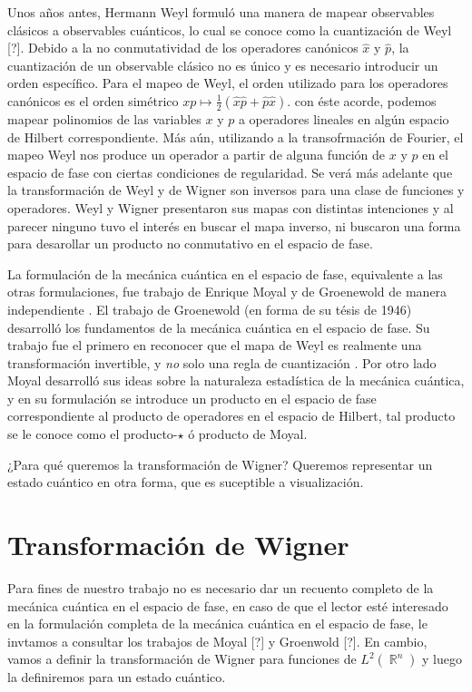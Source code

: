 \documentclass[a4paper]{report}
\DeclareMathOperator{\R}{\mathbb{R}}
\begin{document}
  Unos años antes, Hermann Weyl formuló una manera de mapear
  observables clásicos a observables cuánticos, lo cual se
  conoce como la cuantización de Weyl [?]. Debido a la no
  conmutatividad de los operadores canónicos $\hat{x}$ y
  $\hat{p}$, la cuantización de un observable clásico no es
  único y es necesario introducir un orden específico. Para
  el mapeo de Weyl, el orden utilizado para los operadores
  canónicos es el orden simétrico     $xp \mapsto
  \frac{1}{2}\left( \hat{x} \hat{p} + \hat{p} \hat{x}
  \right)$.  con éste acorde, podemos mapear polinomios de
  las variables $x$ y $p$ a operadores lineales en algún
  espacio de Hilbert correspondiente. Más aún, utilizando a
  la transofrmación de Fourier, el mapeo Weyl nos produce un
  operador a partir de alguna función de $x$ y $p$ en el
  espacio de fase con ciertas condiciones de regularidad. Se
  verá más adelante que la transformación de Weyl y de
  Wigner son inversos para una clase de funciones y
  operadores.  Weyl y Wigner presentaron sus mapas con
  distintas intenciones y al parecer ninguno tuvo el interés
  en buscar el mapa inverso, ni buscaron una forma para
  desarollar un producto no conmutativo en el espacio de
  fase.

  La formulación de la mecánica cuántica en el espacio
  de fase, equivalente a las otras formulaciones, fue
  trabajo de Enrique Moyal y de Groenewold de manera
  independiente \cite{curtrightQuantumMechanicsPhase2012}.
  El trabajo de Groenewold (en forma de su tésis de 1946)
  desarrolló los fundamentos de la mecánica cuántica en el
  espacio de fase. Su trabajo fue el primero en reconocer
  que el mapa de Weyl es realmente una transformación
  invertible, y \textit{no} solo una regla de cuantización
  \cite{todorovQuantizationMystery2012}. Por otro lado Moyal
  desarrolló sus ideas sobre la naturaleza estadística de la
  mecánica cuántica, y en su formulación se introduce un
  producto en el espacio de fase correspondiente al producto
  de operadores en el espacio de Hilbert, tal producto se le
  conoce como el producto-$\star$ ó producto de Moyal.

  ¿Para qué queremos la transformación de Wigner? Queremos
  representar un estado cuántico en otra forma, que es
  suceptible a visualización.

  \section{Transformación de Wigner}

  Para fines de nuestro trabajo no es necesario dar un
  recuento completo de la mecánica cuántica en el espacio de
  fase, en caso de que el lector esté interesado en la
  formulación completa de la mecánica cuántica en el espacio
  de fase, le invtamos a consultar los trabajos de Moyal [?]
  y Groenwold [?]. En cambio, vamos a definir la
  transformación de Wigner para funciones de $L^2(\R^{n})$ y
  luego la definiremos para un estado cuántico.
\end{document}
